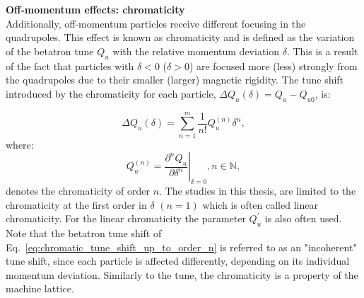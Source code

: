 

\textbf{Off-momentum effects: chromaticity}\\
Additionally, off-momentum particles receive different focusing in the quadrupoles. This effect is known as chromaticity and is defined as the variation of the betatron tune $Q_u$ with the relative momentum deviation $\delta$. This is a result of the fact that particles with $\delta < 0$ ($\delta > 0$) are focused more (less) strongly from the quadrupoles due to their smaller (larger) magnetic rigidity. The tune shift introduced by the chromaticity for each particle, $ \Delta Q_u (\delta)= Q_u - Q_{u0}$, is: %

\begin{equation}\label{eq:chromatic_tune_shift_up_to_order_n}
   \Delta Q_u (\delta) = \sum_{n=1}^m \frac{1}{n!} Q_u^{(n)} \delta^n, 
\end{equation}
where:
\begin{equation}\label{eq:chroma_up_to_order_m}
    Q_u^{(n)} = \left. \frac{\partial ^n Q_u}{\partial \delta^n} \right|_{\delta=0}, n \in \mathbb{N},
 \end{equation}
denotes the chromaticity of order $n$. The studies in this thesis, are limited to the chromaticity at the first order in $\delta$ $(n=1)$ which is often called linear chromaticity. For the linear chromaticity the parameter $Q_u^\prime$ is also often used. Note that the betatron tune shift of Eq.~\eqref{eq:chromatic_tune_shift_up_to_order_n} is referred to as an "incoherent" tune shift, since each particle is affected differently, depending on its individual momentum deviation. Similarly to the tune, the chromaticity is a property of the machine lattice. %



